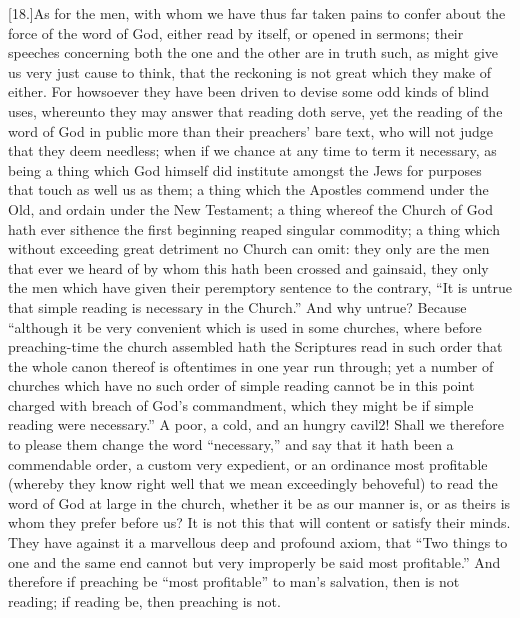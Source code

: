 [18.]As for the men, with whom we have thus far taken pains to confer about the force of the word of God, either read by itself, or opened in sermons; their speeches concerning both the one and the other are in truth such, as might give us very just cause to think, that the reckoning is not great which they make of either. For howsoever they have been driven to devise some odd kinds of blind uses, whereunto they may answer that reading doth serve, yet the reading of the word of God in public more than their preachers’ bare text, who will not judge that they deem needless; when if we chance at any time to term it necessary, as being a thing which God himself did institute amongst the Jews for purposes that touch as well us as them; a thing which the Apostles commend under the Old, and ordain under the New Testament; a thing whereof the Church of God hath ever sithence the first beginning reaped singular commodity; a thing which without exceeding great detriment no Church can omit: they only are the  men that ever we heard of by whom this hath been crossed and gainsaid,
 they only the men which have given their peremptory sentence to the contrary, “It is untrue that simple reading is necessary in the Church.” And why untrue? Because “although it be very convenient which is used in some churches, where before preaching-time the church assembled hath the Scriptures read in such order that the whole canon thereof is oftentimes in one year run through; yet a number of churches which have no such order of simple reading cannot be in this point charged with breach of God’s commandment, which they might be if simple reading were necessary.” A poor, a cold, and an hungry cavil2! Shall we therefore to please them change the word “necessary,” and say that it hath been a commendable order, a custom very expedient, or an ordinance most profitable (whereby they know right well that we mean exceedingly behoveful) to read the word of God at large in the church, whether it be as our manner is, or as theirs is whom they prefer before us? It is not this that will content or satisfy their minds. They have against it a marvellous deep and profound axiom, that “Two things to one and the same end cannot but very improperly be said most profitable.” And therefore if preaching be “most profitable” to man’s salvation, then is not reading; if reading be, then preaching is not.

